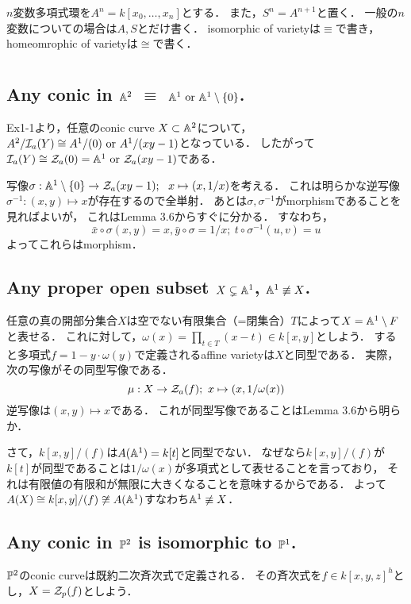\documentclass[a4paper]{jarticle}
\begin{document}
    $n$変数多項式環を$A^n=k[x_0, \dots, x_n]$とする．
    また，$S^n=A^{n+1}$と置く．
    一般の$n$変数についての場合は$A, S$とだけ書く．
    isomorphic of varietyは$\equiv$で書き，homeomrophic of varietyは$\cong$で書く．

\section{ } %
    \subsection{Any conic in $\mathbb{A}^2$ $\equiv$ $\mathbb{A}^1 \text{ or } \mathbb{A}^1 \setminus \{0\}$.}
    Ex1-1より，任意のconic curve $X \subset \mathbb{A}^2$について，
    $A^2/\mathcal{I}_a(Y) \cong A^1/(0) \text{ or } A^1/(xy-1)$となっている．
    したがって$\mathcal{I}_a(Y) \cong \mathcal{Z}_a(0)=\mathbb{A}^1 \text{ or } \mathcal{Z}_a(xy-1)$である．

    写像$\sigma: \mathbb{A}^1 \setminus \{0\} \to \mathcal{Z}_a(xy-1);~~ x \mapsto (x,1/x)$を考える．
    これは明らかな逆写像$\sigma^{-1}: (x,y) \mapsto x$が存在するので全単射．
    あとは$\sigma, \sigma^{-1}$がmorphismであることを見ればよいが，
    これはLemma 3.6からすぐに分かる．
    すなわち，
    \[ \bar{x} \circ \sigma(x,y)=x, \bar{y} \circ \sigma=1/x;~ t \circ \sigma^{-1}(u,v)=u  \]
    よってこれらはmorphism．

    \subsection{Any proper open subset $X \subsetneq \mathbb{A}^1$, $\mathbb{A}^1 \not \equiv X$.}
    任意の真の開部分集合$X$は空でない有限集合（=閉集合）$T$によって$X=\mathbb{A}^1 \setminus F$と表せる．
    これに対して，$\omega(x)=\prod_{t \in T}(x-t) \in k[x,y]$としよう．
    すると多項式$f=1-y \cdot \omega(y)$で定義されるaffine varietyは$X$と同型である．
    実際，次の写像がその同型写像である．
    \[ \mu: X \to \mathcal{Z}_a(f);~ x \mapsto (x, 1/\omega(x)) \]
    逆写像は$(x,y) \mapsto x$である．
    これが同型写像であることはLemma 3.6から明らか．

    さて，$k[x,y]/(f)$は$A(\mathbb{A}^1)=k[t]$と同型でない．
    なぜなら$k[x,y]/(f)$が$k[t]$が同型であることは$1/\omega(x)$が多項式として表せることを言っており，
    それは有限値の有限和が無限に大きくなることを意味するからである．
    よって$A(X) \cong k[x,y]/(f) \not \cong A(\mathbb{A}^1)$すなわち$\mathbb{A}^1 \not \equiv X$．

    \subsection{Any conic in $\mathbb{P}^2$ is isomorphic to $\mathbb{P}^1$.}
    $\mathbb{P}^2$のconic curveは既約二次斉次式で定義される．
    その斉次式を$f \in k[x,y,z]^h$とし，$X=\mathcal{Z}_p(f)$としよう．
\end{document}
